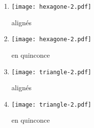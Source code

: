 \documentclass[11pt,a4paper]{article}
\begin{document}
\begin{minipage}[t]{7cm}
\begin{enumerate}
\item \begin{minipage}{1.75cm}\texttt{[image: hexagone-2.pdf]}\end{minipage} alignés
\item \begin{minipage}{1.75cm}\texttt{[image: hexagone-2.pdf]}\end{minipage} en quinconce
\item \begin{minipage}{1.75cm}\texttt{[image: triangle-2.pdf]}\end{minipage} alignés
\item \begin{minipage}{1.75cm}\texttt{[image: triangle-2.pdf]}\end{minipage} en quinconce
\end{enumerate}
\end{minipage}
\hfill
\end{document}
